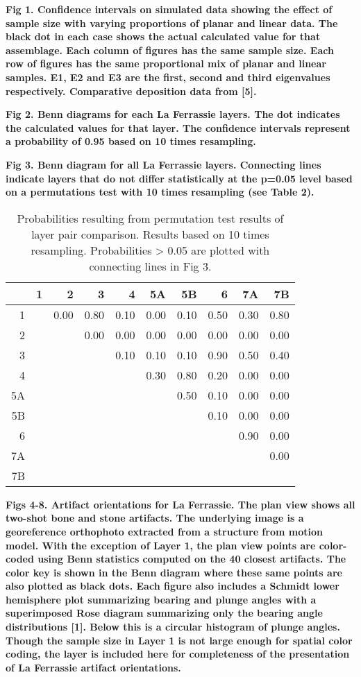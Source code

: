 \documentclass[]{article}
\begin{document}
\textbf{Fig 1. Confidence intervals on simulated data showing the effect
of sample size with varying proportions of planar and linear data. The
black dot in each case shows the actual calculated value for that
assemblage. Each column of figures has the same sample size. Each row of
figures has the same proportional mix of planar and linear samples. E1,
E2 and E3 are the first, second and third eigenvalues respectively.
Comparative deposition data from {[}5{]}.}

\textbf{Fig 2. Benn diagrams for each La Ferrassie layers. The dot
indicates the calculated values for that layer. The confidence intervals
represent a probability of 0.95 based on 10 times resampling.}

\textbf{Fig 3. Benn diagram for all La Ferrassie layers. Connecting
lines indicate layers that do not differ statistically at the p=0.05
level based on a permutations test with 10 times resampling (see Table
2).}

\begin{table}[ht]
\centering
\begin{tabular}{rrrrrrrrrr}
  \hline
 & 1 & 2 & 3 & 4 & 5A & 5B & 6 & 7A & 7B \\ 
  \hline
1 &  & 0.00 & 0.80 & 0.10 & 0.00 & 0.10 & 0.50 & 0.30 & 0.80 \\ 
  2 &  &  & 0.00 & 0.00 & 0.00 & 0.00 & 0.00 & 0.00 & 0.00 \\ 
  3 &  &  &  & 0.10 & 0.10 & 0.10 & 0.90 & 0.50 & 0.40 \\ 
  4 &  &  &  &  & 0.30 & 0.80 & 0.20 & 0.00 & 0.00 \\ 
  5A &  &  &  &  &  & 0.50 & 0.10 & 0.00 & 0.00 \\ 
  5B &  &  &  &  &  &  & 0.10 & 0.00 & 0.00 \\ 
  6 &  &  &  &  &  &  &  & 0.90 & 0.00 \\ 
  7A &  &  &  &  &  &  &  &  & 0.00 \\ 
  7B &  &  &  &  &  &  &  &  &  \\ 
   \hline
\end{tabular}
\caption{Probabilities resulting from permutation test results of layer pair comparison.  Results based on 10  times resampling.  Probabilities > 0.05 are plotted with connecting lines in Fig 3.} 
\end{table}

\textbf{Figs 4-8. Artifact orientations for La Ferrassie. The plan view
shows all two-shot bone and stone artifacts. The underlying image is a
georeference orthophoto extracted from a structure from motion model.
With the exception of Layer 1, the plan view points are color-coded
using Benn statistics computed on the 40 closest artifacts. The color
key is shown in the Benn diagram where these same points are also
plotted as black dots. Each figure also includes a Schmidt lower
hemisphere plot summarizing bearing and plunge angles with a
superimposed Rose diagram summarizing only the bearing angle
distributions {[}1{]}. Below this is a circular histogram of plunge
angles. Though the sample size in Layer 1 is not large enough for
spatial color coding, the layer is included here for completeness of the
presentation of La Ferrassie artifact orientations.}
\end{document}
